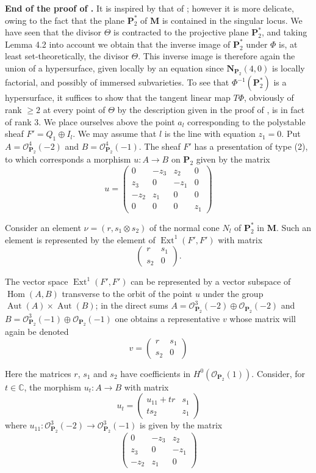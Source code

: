 \documentclass[12pt,english]{smfart}%
\theoremstyle{plain}
\theoremstyle{definition}
\theoremstyle{remark}
\newcommand{\PP}{\mathbf{P}}
\newcommand{\Pd}{\PP_{2}^{*}}          %
\newcommand{\NN}{\mathbf{N}}           %
\newcommand{\MM}{\mathbf{M}}           %
\newcommand{\CC}{\mathbb{C}}
\newcommand{\Oo}{\mathcal{O}}
\DeclareMathOperator{\Hom}{Hom}
\DeclareMathOperator{\Ext}{Ext}
\DeclareMathOperator{\Aut}{Aut}
\newcommand{\origpage}[1]{\marginnote{\scriptsize\itshape p.~#1}}
\begin{document}
\medskip
\noindent\textbf{End of the proof of .} It is inspired by that of ; however it is more delicate, owing to the fact that the plane $\Pd$ of $\MM$ is contained in the singular locus. We have seen that the divisor $\Theta$ is contracted to the projective plane $\Pd$, and taking Lemma 4.2 into account we obtain that the inverse image of $\Pd$ under $\Phi$ is, at least set-theoretically, the divisor $\Theta$. This inverse image is therefore again the union of a hypersurface, given locally by an equation since $\NN_{\PP_2}(4,0)$ is locally factorial, and possibly of immersed subvarieties. To see that $\Phi^{-1}(\Pd)$ is a hypersurface, it suffices to show that the tangent linear map $T\Phi$, obviously of rank $\ge 2$ at every point of $\Theta$ by the description given in the proof of , is in fact of rank $3$. We place ourselves above the point $a_l$ corresponding to the polystable sheaf $F'=Q_1\oplus I_l$. We may assume that $l$ is the line with equation $z_1=0$. Put $A=\Oo^4_{\PP_2}(-2)$ and $B=\Oo^4_{\PP_2}(-1)$. The sheaf $F'$ has a presentation of type (2), to which corresponds a morphism $u:A\to B$ on $\PP_2$ given by the matrix
\[
u=
\begin{pmatrix}
0 & -z_3 & z_2 & 0\\
z_3 & 0 & -z_1 & 0\\
-z_2 & z_1 & 0 & 0\\
0 & 0 & 0 & z_1
\end{pmatrix}
\]

Consider an element $\nu = (r, s_1\otimes s_2)$ of the normal cone $N_l$ of $\Pd$ in $\MM$. Such an element is represented by the element of $\Ext^1(F',F')$ with matrix
\[
\begin{pmatrix} r & s_1\\ s_2 & 0\end{pmatrix}.
\]

The vector space $\Ext^1(F',F')$ can be represented by a vector subspace of $\Hom(A,B)$ transverse to the orbit of the point $u$ under the group $\Aut(A)\times\Aut(B)$; in the direct sums $A = \Oo^3_{\PP_2}(-2)\oplus \Oo_{\PP_2}(-2)$ and $B = \Oo^3_{\PP_2}(-1)\oplus \Oo_{\PP_2}(-1)$ one obtains a representative $v$ whose matrix will again be denoted
\[
v=\begin{pmatrix} r & s_1\\ s_2 & 0\end{pmatrix}
\]

\origpage{667}%
Here the matrices $r$, $s_1$ and $s_2$ have coefficients in $H^0(\Oo_{\PP_2}(1))$. Consider, for $t\in\CC$, the morphism $u_t:A\to B$ with matrix
\[
u_t=\begin{pmatrix} u_{11}+tr & s_1\\ ts_2 & z_1\end{pmatrix}
\]
where $u_{11}:\Oo^3_{\PP_2}(-2)\to \Oo^3_{\PP_2}(-1)$ is given by the matrix
\[
\begin{pmatrix}
0 & -z_3 & z_2\\
z_3 & 0 & -z_1\\
-z_2 & z_1 & 0
\end{pmatrix}
\]
\end{document}
